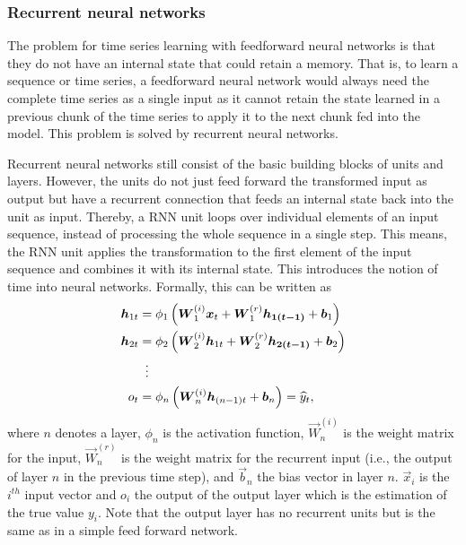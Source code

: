 \subsubsection{Recurrent neural networks}

The problem for time series learning with feedforward neural networks is that they do not have an internal state that could retain a memory. That is, to learn a sequence or time series, a feedforward neural network would always need the complete time series as a single input as it cannot retain the state learned in a previous chunk of the time series to apply it to the next chunk fed into the model. This problem is solved by recurrent neural networks.

Recurrent neural networks still consist of the basic building blocks of units and layers. However, the units do not just feed forward the transformed input as output but have a recurrent connection that feeds an internal state back into the unit as input. Thereby, a RNN unit loops over individual elements of an input sequence, instead of processing the whole sequence in a single step. This means, the RNN unit applies the transformation to the first element of the input sequence and combines it with its internal state. This introduces the notion of time into neural networks. Formally, this can be written as
%
\begin{equation} \label{RNN}
\begin{split}
    \vec{h}_{1t}&=\phi_1\left(\vec{W}_1^{(i)}\vec{x}_t+\vec{W}^{(r)}_1\vec{h_{1(t-1)}}+\vec{b}_1\right)\\
    \vec{h}_{2t}&=\phi_2\left(\vec{W}_2^{(i)}\vec{h}_{1t}+\vec{W}^{(r)}_2\vec{h_{2(t-1)}}+\vec{b}_2\right)\\
    &\setbox0\hbox{=}\mathrel{\makebox[\wd0]{\hfil\vdots\hfil}}\\
    o_t&=\phi_n\left(\vec{W}_n^{(i)}\vec{h}_{(n-1)t}+\vec{b}_n\right)=\widehat{y}_t,
\end{split}
\end{equation}
%
where $n$ denotes a layer, $\phi_n$ is the activation function, $\vec{W}_n^{(i)}$ is the weight matrix for the input, $\vec{W}_n^{(r)}$ is the weight matrix for the recurrent input (i.e., the output of layer $n$ in the previous time step), and $\vec{b}_n$ the bias vector in layer $n$. $\vec{x}_i$ is the $i^{th}$ input vector and $o_i$ the output of the output layer which is the estimation of the true value $y_i$. Note that the output layer has no recurrent units but is the same as in a simple feed forward network.

